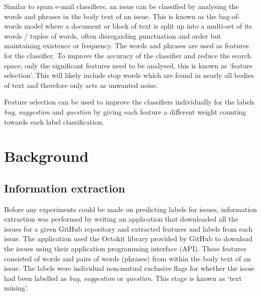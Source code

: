 Similar to spam e-mail classifiers, an issue can be classified by analysing the words and phrases in the body text of an issue.
This is known as the bag-of-words model \cite{wikipedia:bagofwords} where a document or block of text is split up into a
multi-set of its words / tuples of words, often disregarding punctuation and order but maintaining existence or frequency. The
words and phrases are used as features for the classifier. To improve the accuracy of the classifier and reduce the search
space, only the significant features need to be analysed, this is known as `feature selection'. This will likely include stop
words which are found in nearly all bodies of text and therefore only acts as unwanted noise.

Feature selection can be used to improve the classifiers individually for the labels \textit{bug}, \textit{suggestion} and
\textit{question} by giving each feature a different weight counting towards each label classification.

\section{Background}
\subsection{Information extraction}
Before any experiments could be made on predicting labels for issues, information extraction was performed by writing an
application that downloaded all the issues for a given GitHub repository and extracted features and labels from each issue. The
application used the Octokit \cite{octokit} library provided by GitHub to download the issues using their application
programming interface (API). These features consisted of words and pairs of words (phrases) from within the body text of an
issue. The labels were individual non-mutual exclusive flags for whether the issue had been labelled as \textit{bug},
\textit{suggestion} or \textit{question}. This stage is known as `text mining'.

